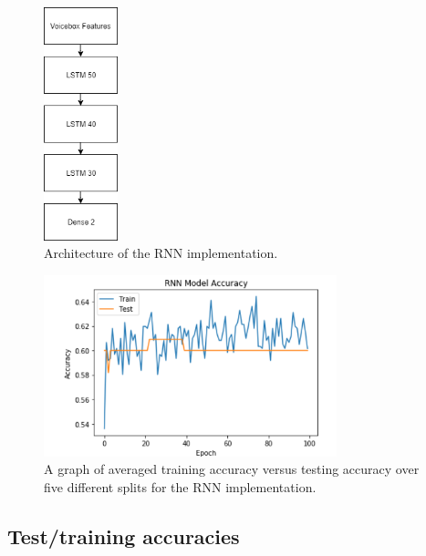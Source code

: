 \documentclass{article}
\begin{document}
\begin{figure}[htb]
	\centering
	\includegraphics[width = 2.15cm]{figs/rnn_architecture}
	\caption{Architecture of the RNN implementation.}
	\label{fig:rnn_architecture}
\end{figure}

\begin{figure}[htb]
	\centering
	\includegraphics[width = 8.5cm]{figs/rnn_graph}
	\caption{A graph of averaged training accuracy versus testing accuracy over five different splits for the RNN implementation.}
	\label{fig:rnn_graph}
\end{figure}

\subsection{Test/training accuracies}
\label{subsec:tables}
\end{document}
